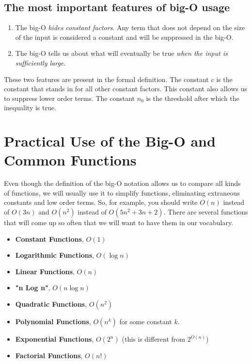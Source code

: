 \section{The most important features of big-O usage}

\begin{enumerate}

\item 

The big-O \emph{hides constant factors}.  Any term that does not depend on the size of the input is considered a constant and will be suppressed in the big-O.



\item 

The big-O tells us about what will eventually be true \emph{when the input is sufficiently large}.



\end{enumerate}

These two features are present in the formal definition.
The constant $c$ is the constant that stands in for all other constant factors.
This constant also allows us to suppress lower order terms.
The constant $n_0$ is the threshold after which the inequality is true.

\chapter{Practical Use of the Big-O and Common Functions}


Even though the definition of the big-O notation allows us to compare all kinds of functions, we will usually use it to simplify functions, eliminating extraneous constants and low order terms.
So, for example, you should write $O(n)$ instead of $O(3n)$ and $O(n^2)$ instead of $O(5n^2 + 3n + 2)$.
There are several functions that will come up so often that we will want to have them in our vocabulary.

\begin{itemize}

\item \textbf{Constant Functions}, $O(1)$

\item \textbf{Logarithmic Functions}, $O(\log n)$

\item \textbf{Linear Functions}, $O(n)$

\item \textbf{"n Log n"}, $O(n\log n)$

\item \textbf{Quadratic Functions}, $O(n^2)$

\item \textbf{Polynomial Functions}, $O(n^k)$ for some constant $k$.

\item \textbf{Exponential Functions}, $O(2^n)$ (this is different from $2^{O(n)}$)

\item \textbf{Factorial Functions}, $O(n!)$

\end{itemize}
